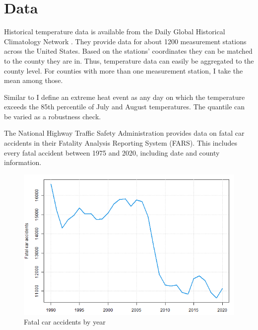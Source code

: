 
\section{Data}

Historical temperature data is available from the Daily Global Historical Climatology Network \citep{Menne_2012}. They provide data for about 1200 measurement stations across the United States. Based on the stations' coordinates they can be matched to the county they are in. Thus, temperature data can easily be aggregated to the county level. For counties with more than one measurement station, I take the mean among those.

Similar to \citet{Habeeb_2015} I define an extreme heat event as any day on which the temperature exceeds the 85th percentile of July and August temperatures. The quantile can be varied as a robustness check.

The National Highway Traffic Safety Administration provides data on fatal car accidents in their Fatality Analysis Reporting System (FARS). This includes every fatal accident between 1975 and 2020, including date and county information.


\begin{figure}[h]
	\centering
	\includegraphics[scale = 0.5]{"../Code & Data/FatalAccidentsYearly.png"}
	\caption{Fatal car accidents by year}
\end{figure} 

